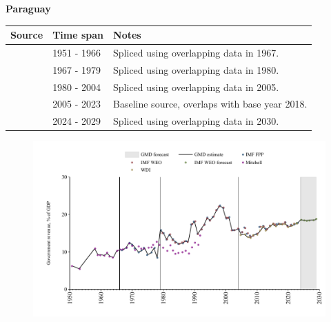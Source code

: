 \documentclass[12pt,a4paper,landscape]{article}
\begin{document}
\begin{adjustbox}{max totalsize={\paperwidth}{\paperheight},center}
\begin{minipage}[t][\textheight][t]{\textwidth}
\vspace*{0.5cm}
{}
\begin{center}
{\Large\bfseries Paraguay}
\end{center}
\vspace{0.5cm}
\begin{table}[H]
\centering
\small
\begin{tabular}{|l|l|l|}
\hline
\textbf{Source} & \textbf{Time span} & \textbf{Notes} \\
\hline
\rowcolor{white}\cite{Mitchell}& 1951 - 1966 &Spliced using overlapping data in 1967.\\
\rowcolor{lightgray}\cite{IMF_FPP}& 1967 - 1979 &Spliced using overlapping data in 1980.\\
\rowcolor{white}\cite{IMF_WEO}& 1980 - 2004 &Spliced using overlapping data in 2005.\\
\rowcolor{lightgray}\cite{WDI}& 2005 - 2023 &Baseline source, overlaps with base year 2018.\\
\rowcolor{white}\cite{IMF_WEO_forecast}& 2024 - 2029 &Spliced using overlapping data in 2030.\\
\hline
\end{tabular}
\end{table}
\begin{figure}[H]
\centering
\includegraphics[width=\textwidth,height=0.6\textheight,keepaspectratio]{graphs/PRY_govrev_GDP.pdf}
\end{figure}
\end{minipage}
\end{adjustbox}
\end{document}
